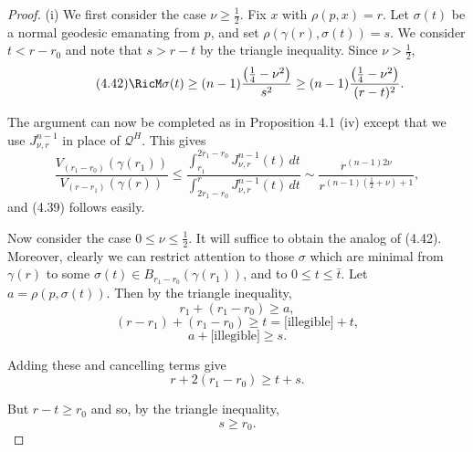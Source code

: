 \begin{proof}
(i) We first consider the case $\nu \geq \frac12$. Fix $x$ with
$\rho(p,x)=r$. Let $\sigma(t)$ be a normal geodesic emanating from $p$, and set
$\rho(\gamma(r),\sigma(t))=s$. We consider $t<r-r_0$ and note that $s>r-t$ by
the triangle inequality. Since $\nu > \frac12$,
\begin{equation}\tag{4.42}
\RicM\sigma(t) \geq (n-1)\frac{\left(\frac14-\nu^2\right)}{s^2} \geq
(n-1)\frac{\left(\frac14-\nu^2\right)}{(r-t)^2}.
\end{equation}

The argument can now be completed as in Proposition 4.1 (iv) except that we
use $J^{n-1}_{\nu,r}$ in place of $\mathscr{Q}^H$. This gives
\begin{equation}\tag{4.43}
\frac{V_{(r_1-r_0)}(\gamma(r_1))}{V_{(r-r_1)}(\gamma(r))}
\leq
\frac{\int_{r_1}^{2r_1-r_0} J^{n-1}_{\nu,r}(t)\,dt}{\int_{2r_1-r_0}^{r} J^{n-1}_{\nu,r}(t)\,dt}
\sim \frac{r^{(n-1)2\nu}}{r^{(n-1)(\frac12+\nu)+1}},
\end{equation}
and (4.39) follows easily.

Now consider the case $0 \leq \nu \leq \frac12$. It will suffice to obtain the
analog of (4.42). Moreover, clearly we can restrict attention to those $\sigma$
which are minimal from $\gamma(r)$ to some $\sigma(t) \in B_{r_1-r_0}(\gamma(r_1))$,
and to $0 \leq t \leq \bar t$. Let $a=\rho(p,\sigma(t))$. Then by the triangle
inequality,
\begin{equation}\tag{4.44}
r_1 + (r_1-r_0) \geq a,
\end{equation}
\begin{equation}\tag{4.45}
(r-r_1) + (r_1-r_0) \geq t = \text{[illegible]} + t,
\end{equation}
\begin{equation}\tag{4.46}
a + \text{[illegible]} \geq s.
\end{equation}

Adding these and cancelling terms give
\begin{equation}
r + 2(r_1 - r_0) \geq t + s.
\tag{4.47}
\end{equation}

But $r - t \geq r_0$ and so, by the triangle inequality,
\begin{equation}
s \geq r_0.
\tag{4.48}
\end{equation}


\end{proof}
